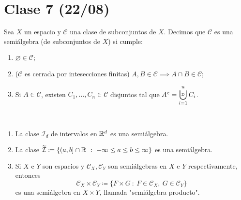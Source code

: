 
	\section{Clase 7 (22/08)}

	\begin{definition}[semiálgebra]
		Sea $X$ un espacio y $\mathscr{C}$ una clase de subconjuntos de $X$. Decimos que $\mathscr{C}$ es una semiálgebra (de subconjuntos de $X$) si cumple:
		\begin{enumerate}
			\item $\varnothing \in \mathscr{C}$;

			\item ($\mathscr{C}$ es cerrada por intesecciones finitas) $A,B\in\mathscr{C} \implies A \cap B \in \mathscr{C}$;
			
			\item Si $A \in \mathscr{C}$, existen $C_1,\dots,C_n \in \mathscr{C}$ disjuntos tal que $A^c = \displaystyle\bigcupd_{i=1}^{n} C_i$.
		\end{enumerate}
	\end{definition}
	
	\begin{eg}~
		\begin{enumerate}
			\item La clase $\mathcal{I}_d$ de intervalos en $\mathbb{R}^d$ es una semiálgebra.

			\item La clase $\widetilde{\mathcal{I}} \coloneq \{ (a,b] \cap \mathbb{R} \ : \ -\infty \leq a \leq b \leq \infty \}$ es una semiálgebra.

			\item Si $X$ e $Y$ son espacios y $\mathscr{C}_X, \mathscr{C}_Y$ son semiálgebras en $X$ e $Y$ respectivamente, entonces
			\[ \mathscr{C}_X \times \mathscr{C}_Y \coloneq \{ F \times G \ : \ F \in \mathscr{C}_X,\ G \in \mathscr{C}_Y \} \]
			es una semiálgebra en $X \times Y$, llamada "semiálgebra producto".
		\end{enumerate}
	\end{eg}


